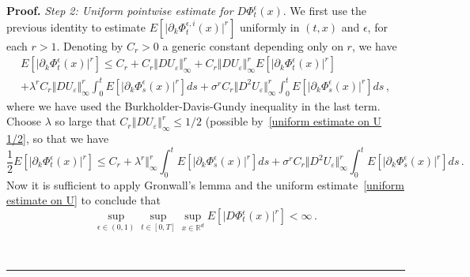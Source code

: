 \documentclass[a4paper,10pt]{article}
\newenvironment{proof}[1][Proof]{\noindent\textbf{#1.} }{\ \rule{0.5em}{0.5em}}
\newcommand{\eps}{\epsilon}
\begin{document}
\begin{proof}
\emph{Step 2: Uniform pointwise estimate for $D\Phi^{\eps}_t(x)$}. We first use the previous identity to estimate $E[\vert \partial_{k}\Phi^{\epsilon,i}_{t}(x) \vert ^{r}]
$ uniformly in $(  t,x)  $ and $\epsilon$, for each $r>1$. Denoting
by $C_{r}>0$ a generic constant depending only on $r$, we have
\begin{multline*}
E[ \vert \partial_{k}\Phi^{\epsilon}_{t}(x) \vert^{r}] \leq C_{r}+C_{r} \Vert DU_{\varepsilon} \Vert_{\infty}^{r}+C_{r} \Vert DU_{\varepsilon} \Vert
_{\infty}^{r} E [ \vert \partial_{k}\Phi^{\epsilon}_{t}(x) \vert^{r} ]  \\
 +\lambda^{r}C_{r} \Vert DU_{\varepsilon} \Vert _{\infty}^{r}
\int_{0}^{t}E [ \vert \partial_{k}\Phi^{\epsilon}_{s}(x) \vert^{r}]  ds
 +\sigma^{r}C_{r} \Vert D^{2}U_{\varepsilon} \Vert _{\infty}^{r}
\int_{0}^{t} E[ \vert \partial_{k}\Phi^{\epsilon}_{s}(x) \vert^{r}]  ds \,,
\end{multline*}
where we have used the Burkholder-Davis-Gundy inequality in the last term.
Choose $\lambda$ so large that $C_{r}\left\Vert DU_{\varepsilon}\right\Vert
_{\infty}^{r}\leq 1/2$ (possible by~\eqref{uniform estimate on U 1/2}, so that we have
\begin{equation*}
\frac{1}{2} E[ \vert \partial_{k}\Phi^{\epsilon}_{t}(x) \vert^{r}] \leq C_{r} 
 +\lambda^{r} \Vert _{\infty}^{r}
\int_{0}^{t}E [ \vert \partial_{k}\Phi^{\epsilon}_{s}(x) \vert^{r}] ds
 +\sigma^{r} C_{r} \Vert D^{2}U_{\varepsilon}\Vert _{\infty}^{r}
\int_{0}^{t} E[ \vert \partial_{k}\Phi^{\epsilon}_{s}(x) \vert^{r} ]  ds \,.
\end{equation*}
Now it is sufficient to apply Gronwall's lemma and the uniform estimate~\eqref{uniform estimate on U} to conclude that
\begin{equation}
\sup_{\epsilon\in (0,1)  }\sup_{t\in [0,T]  } 
\sup_{x\in\mathbb{R}^{d}}E [ \vert D\Phi^{\epsilon}_{t}(x) \vert^{r}] <\infty \,.\label{uniform estimate on phi} 
\end{equation}


\end{proof}
\end{document}
